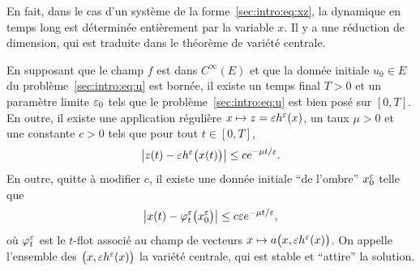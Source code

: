 En fait, dans le cas d'un système de la forme~\eqref{sec:intro:eq:xz}, la dynamique en temps long est déterminée entièrement par la variable $x$. Il y a une réduction de dimension, qui est traduite dans le théorème de variété centrale. 
\begin{FRtheorem*}
    En supposant que le champ $f$ est dans $C^\infty(E)$ et que la donnée initiale $u_0 \in E$ du problème~\eqref{sec:intro:eq:u} est bornée, il existe un temps final $T > 0$ et un paramètre limite $\varepsilon_0$ tels que le problème~\eqref{sec:intro:eq:u} est bien posé sur $[0,T]$. En outre, il existe une application régulière $x \mapsto z = \varepsilon h^\varepsilon(x)$, un taux $\mu > 0$ et une constante $c > 0$ tels que pour tout $t \in [0,T]$, 
    \begin{equation*}
        \left| z(t) - \varepsilon h^\varepsilon\big( x(t) \big) \right|
        \leq c e^{-\mu t/\varepsilon} .
    \end{equation*}
    En outre, quitte à modifier $c$, il existe une donnée initiale \enquote{de l'ombre} $x_0^\varepsilon$ telle que 
    \begin{equation*}
        \big| x(t) - \varphi_t^\varepsilon \big( x_0^\varepsilon \big) \big| 
        \leq c \varepsilon e^{-\mu t/\varepsilon} , 
    \end{equation*}
    où $\varphi^\varepsilon_t$ est le $t$-flot associé au champ de vecteurs $x \mapsto a\big(x, \varepsilon h^\varepsilon(x) \big)$. On appelle l'ensemble des $\big( x, \varepsilon h^\varepsilon(x) \big)$ la variété centrale, qui est stable et \enquote{attire} la solution. 
\end{FRtheorem*}

